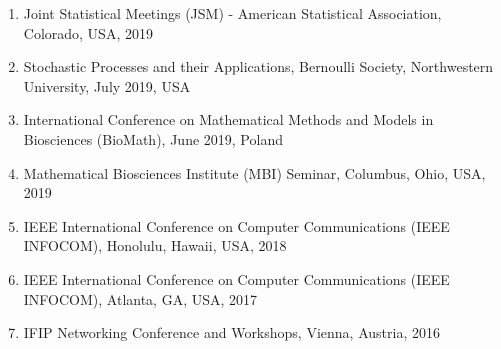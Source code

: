 \documentclass[11pt,a4paper,sans]{moderncv}        %
\begin{document}
\begin{enumerate}
	\item{Joint Statistical Meetings (JSM) - American Statistical Association, Colorado, USA, 2019} 
	\item{Stochastic Processes and their Applications, Bernoulli Society, Northwestern University, July 2019, USA}
	\item{International Conference on Mathematical Methods and Models in Biosciences (BioMath), June 2019, Poland}
	\item{Mathematical Biosciences Institute (MBI) Seminar, Columbus, Ohio, USA, 2019}
	\item{IEEE International Conference on Computer Communications (IEEE INFOCOM), Honolulu, Hawaii, USA, 2018}
	\item{IEEE International Conference on Computer Communications (IEEE INFOCOM), Atlanta, GA, USA, 2017}
	\item{IFIP Networking Conference  and Workshops, Vienna, Austria, 2016}
\end{enumerate}



\end{document}
